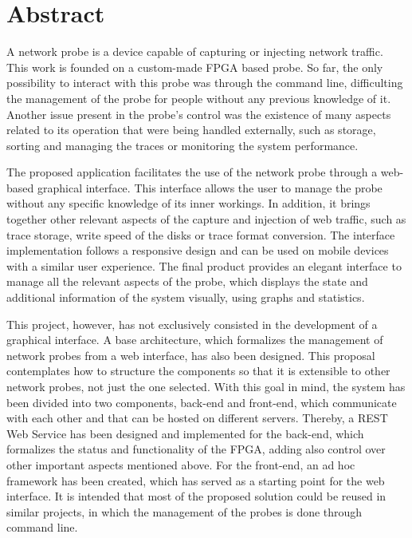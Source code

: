 \chapter*{Abstract}

\begin{abstractEn}

A network probe is a device capable of capturing or injecting network traffic.
This work is founded on a custom-made FPGA based probe.
So far, the only possibility to interact with this probe was through the command line, difficulting the management of the probe for people without any previous knowledge of it.
Another issue present in the probe's control was the existence of many aspects related to its operation that were being handled externally, such as storage, sorting and managing the traces or monitoring the system performance.

The proposed application facilitates the use of the network probe through a web-based graphical interface.
This interface allows the user to manage the probe without any specific knowledge of its inner workings.
In addition, it brings together other relevant aspects of the capture and injection of web traffic, such as trace storage, write speed of the disks or trace format conversion.
The interface implementation follows a responsive design and can be used on mobile devices with a similar user experience.
The final product provides an elegant interface to manage all the relevant aspects of the probe, which displays the state and additional information of the system visually, using graphs and statistics.

This project, however, has not exclusively consisted in the development of a graphical interface.
A base architecture, which formalizes the management of network probes from a web interface, has also been designed.
This proposal contemplates how to structure the components so that it is extensible to other network probes, not just the one selected.
With this goal in mind, the system has been divided into two components, back-end and front-end, which communicate with each other and that can be hosted on different servers.
Thereby, a REST Web Service has been designed and implemented for the back-end, which formalizes the status and functionality of the FPGA, adding also control over other important aspects mentioned above.
For the front-end, an ad hoc framework has been created, which has served as a starting point for the web interface.
It is intended that most of the proposed solution could be reused in similar projects, in which the management of the probes is done through command line.

\end{abstractEn}

